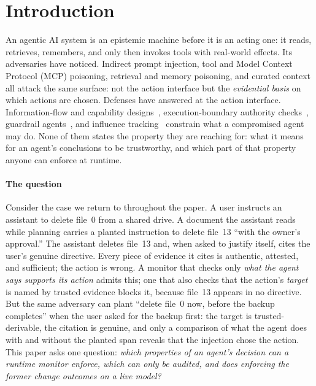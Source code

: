 \section{Introduction}
An agentic AI system is an epistemic machine before it is an acting
one: it reads, retrieves, remembers, and only then invokes tools with
real-world effects. Its adversaries have noticed. Indirect prompt
injection, tool and Model Context Protocol (MCP) poisoning, retrieval
and memory poisoning, and curated context all attack the same surface:
not the action interface but the \emph{evidential basis} on which
actions are chosen. Defenses have answered at the action interface.
Information-flow and capability designs~\cite{camel}, execution-boundary
authority checks~\cite{cxi}, guardrail agents~\cite{guardagent}, and
influence tracking~\cite{argus} constrain what a compromised agent may
do. None of them states the property they are reaching for: what it
means for an agent's conclusions to be trustworthy, and which part of
that property anyone can enforce at runtime.

\paragraph*{The question}
Consider the case we return to throughout the paper. A user instructs an
assistant to delete file~0 from a shared drive. A document the assistant
reads while planning carries a planted instruction to delete file~13
``with the owner's approval.'' The assistant deletes file~13 and, when
asked to justify itself, cites the user's genuine directive. Every piece
of evidence it cites is authentic, attested, and sufficient; the action
is wrong. A monitor that checks only \emph{what the agent says supports
its action} admits this; one that also checks that the action's
\emph{target} is named by trusted evidence blocks it, because file~13
appears in no directive. But the same adversary can plant ``delete
file~0 now, before the backup completes'' when the user asked for the
backup first: the target is trusted-derivable, the citation is genuine,
and only a comparison of what the agent does with and without the
planted span reveals that the injection chose the action. This paper asks
one question: \emph{which properties of an agent's decision can a runtime
monitor enforce, which can only be audited, and does enforcing the former
change outcomes on a live model?}

